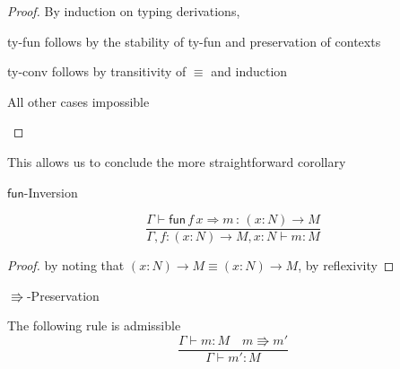 \begin{proof}
By induction on typing derivations,

\begin{casenv}
  \item \textrm{ty-fun} follows by the stability of \textrm{ty-fun} and preservation of contexts
  \item \textrm{ty-conv} follows by transitivity of $\equiv$ and induction
  \item All other cases impossible
\end{casenv}

\end{proof}
This allows us to conclude the more straightforward corollary 
\begin{cor}
$\mathsf{fun}$-Inversion

\[
\frac{\Gamma\vdash\mathsf{fun}\,f\,x\Rightarrow m\,:\,\left(x:N\right)\rightarrow M}{\Gamma,f:\left(x:N\right)\rightarrow M,x:N\vdash m:M}
\]
\end{cor}

\begin{proof}
by noting that $\left(x:N\right)\rightarrow M\equiv\left(x:N\right)\rightarrow M$, by reflexivity 
\end{proof}
\begin{thm}
$\Rrightarrow$-Preservation 

The following rule is admissible
\[
\frac{\Gamma\vdash m:M\quad m\Rrightarrow m'}{\Gamma\vdash m':M}
\]
\end{thm}

